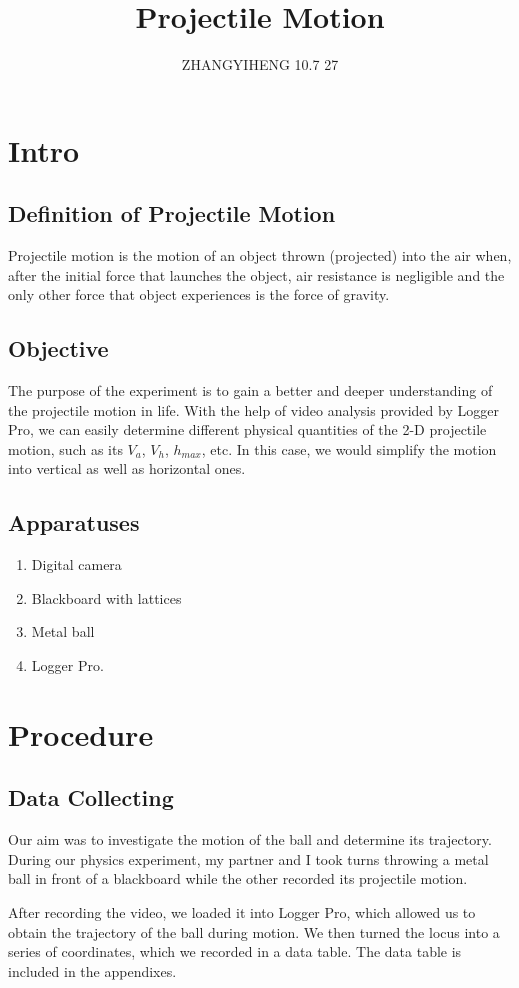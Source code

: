 \documentclass[12pt,a4paper]{article}
\title{Projectile Motion}
\author{ZHANGYIHENG 10.7 27}
\date{}
\begin{document}
\begin{spacing}{1.25}
\maketitle
\tableofcontents
\setlength{\parindent}{4ex}
\newpage

\section{Intro}
\subsection{Definition of Projectile Motion}
Projectile motion is the motion of an object thrown (projected) into the air when, after the initial force that launches the object, air resistance is negligible and the only other force that object experiences is the force of gravity.
\subsection{Objective}
The purpose of the experiment is to gain a better and deeper understanding of the projectile motion in life. With the help of video analysis provided by Logger Pro, we can easily determine different physical quantities of the 2-D projectile motion, such as its \(V_a\), \(V_h\), \(h_{max}\), etc. In this case, we would simplify the motion into vertical as well as horizontal ones.
\subsection{Apparatuses}
\begin{enumerate}
    \setlength{\itemsep}{1ex}
    \item Digital camera
    \item Blackboard with lattices 
    \item Metal ball
    \item Logger Pro.
    \setlength{\topsep}{1ex}
\end{enumerate}
\newpage
\section{Procedure}
\subsection{Data Collecting}
Our aim was to investigate the motion of the ball and determine its trajectory. During our physics experiment, my partner and I took turns throwing a metal ball in front of a blackboard while the other recorded its projectile motion.\par
After recording the video, we loaded it into Logger Pro, which allowed us to obtain the trajectory of the ball during motion. We then turned the locus into a series of coordinates, which we recorded in a data table. The data table is included in the appendixes.\par

\end{spacing}
\end{document}
